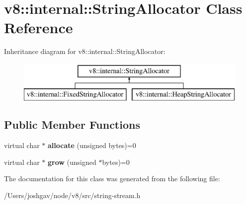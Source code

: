 \hypertarget{classv8_1_1internal_1_1_string_allocator}{}\section{v8\+:\+:internal\+:\+:String\+Allocator Class Reference}
\label{classv8_1_1internal_1_1_string_allocator}
Inheritance diagram for v8\+:\+:internal\+:\+:String\+Allocator\+:\begin{figure}[H]
\begin{center}
\leavevmode
\includegraphics[height=2.000000cm]{classv8_1_1internal_1_1_string_allocator}
\end{center}
\end{figure}
\subsection*{Public Member Functions}
\begin{DoxyCompactItemize}
\item 
virtual char $\ast$ {\bfseries allocate} (unsigned bytes)=0\hypertarget{classv8_1_1internal_1_1_string_allocator_a3e2a67fc8455cf91240490208789967d}{}\label{classv8_1_1internal_1_1_string_allocator_a3e2a67fc8455cf91240490208789967d}

\item 
virtual char $\ast$ {\bfseries grow} (unsigned $\ast$bytes)=0\hypertarget{classv8_1_1internal_1_1_string_allocator_ac27c6a95c5a5e07d202f44f2d71febec}{}\label{classv8_1_1internal_1_1_string_allocator_ac27c6a95c5a5e07d202f44f2d71febec}

\end{DoxyCompactItemize}


The documentation for this class was generated from the following file\+:\begin{DoxyCompactItemize}
\item 
/\+Users/joshgav/node/v8/src/string-\/stream.\+h\end{DoxyCompactItemize}
